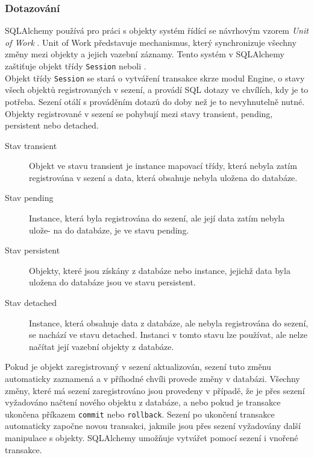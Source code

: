 \documentclass[ing,male,java,dept456]{diploma}						%
\begin{document}
\subsubsection{Dotazování}

SQLAlchemy používá pro práci s objekty systém řídící se návrhovým vzorem \textit{Unit of Work} \cite{fowler}. Unit of Work představuje mechanismus, který synchronizuje všechny změny mezi objekty a jejich vazební záznamy. Tento systém v SQLAlchemy zaštiťuje objekt třídy \lstinline[style=inlinepython]|Session| neboli . \\
Objekt třídy \lstinline[style=inlinepython]|Session| se stará o vytváření transakce skrze modul Engine, o stavy všech objektů registrovaných v sezení, a provádí SQL dotazy ve chvílích, kdy je to potřeba. Sezení otálí s prováděním dotazů do doby než je to nevyhnutelně nutné. Objekty registrované v sezení se pohybují mezi stavy transient, pending, persistent nebo detached.

\begin{description}
\item[Stav transient] Objekt ve stavu transient je instance mapovací třídy, která nebyla zatím registrována v sezení a data, která obsahuje nebyla uložena do databáze. 
\item[Stav pending] Instance, která byla registrována do sezení, ale její data zatím nebyla ulože- na do databáze, je ve stavu pending.
\item[Stav persistent] Objekty, které jsou získány z databáze nebo instance, jejichž data byla uložena do databáze jsou ve stavu persistent.
\item[Stav detached] Instance, která obsahuje data z databáze, ale nebyla registrována do sezení, se nachází ve stavu detached. Instanci v tomto stavu lze používat, ale nelze načítat její vazební objekty z databáze.
\end{description}

Pokud je objekt zaregistrovaný v sezení aktualizován, sezení tuto změnu automaticky zaznamená a v příhodné chvíli provede změny v databázi. Všechny změny, které má sezení zaregistrováno jsou provedeny v případě, že je přes sezení vyžadováno načtení nového objektu z databáze, a nebo pokud je transakce ukončena příkazem \lstinline[style=inlinepython]|commit| nebo \lstinline[style=inlinepython]|rollback|. Sezení po ukončení transakce automaticky započne novou transakci, jakmile jsou přes sezení vyžadovány další manipulace s objekty. SQLAlchemy umožňuje vytvářet pomocí sezení i vnořené transakce. \\
\end{document}
